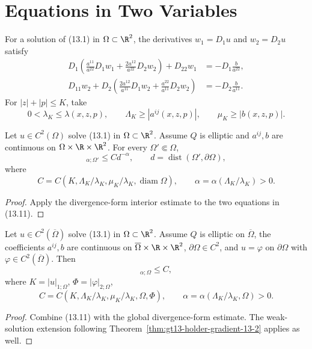 \section{Equations in Two Variables}

For a solution of \textup{(13.1)} in $\Omega\subset\R^2$, the derivatives
$w_1=D_1u$ and $w_2=D_2u$ satisfy
\begin{equation}
\begin{aligned}
D_1\!\left(\frac{a^{11}}{a^{22}}D_1w_1
 +\frac{2a^{12}}{a^{22}}D_2w_2\right)+D_{22}w_1
 &=-D_1\frac b{a^{22}},\\
D_{11}w_2+D_2\!\left(\frac{2a^{12}}{a^{11}}D_1w_2
 +\frac{a^{22}}{a^{11}}D_2w_2\right)
 &=-D_2\frac b{a^{11}}.
\end{aligned}
\tag{13.11}
\end{equation}
For $|z|+|p|\le K$, take
\begin{equation}
0<\lambda_K\le\lambda(x,z,p),\qquad
\Lambda_K\ge|a^{ij}(x,z,p)|,\qquad
\mu_K\ge|b(x,z,p)|.
\tag{13.12}
\end{equation}

\begin{theorem}
\label{thm:gt13-holder-gradient-13-3}
Let $u\in C^2(\Omega)$ solve \textup{(13.1)} in $\Omega\subset\R^2$.
Assume $Q$ is elliptic and $a^{ij},b$ are continuous on
$\Omega\times\R\times\R^2$.  For every $\Omega'\Subset\Omega$,
\begin{equation}
[Du]_{\alpha;\Omega'}\le Cd^{-\alpha},
\qquad d=\operatorname{dist}(\Omega',\partial\Omega),
\tag{13.13}
\end{equation}
where
\[
C=C(K,\Lambda_K/\lambda_K,\mu_K/\lambda_K,
\operatorname{diam}\Omega),
\qquad
\alpha=\alpha(\Lambda_K/\lambda_K)>0.
\]
\end{theorem}
\begin{proof}
\sketch Apply the divergence-form interior estimate to the two equations
in \textup{(13.11)}.
\end{proof}

\begin{theorem}
\label{thm:gt13-holder-gradient-13-4}
Let $u\in C^2(\overline\Omega)$ solve \textup{(13.1)} in
$\Omega\subset\R^2$.  Assume $Q$ is elliptic on $\overline\Omega$, the
coefficients $a^{ij},b$ are continuous on
$\overline\Omega\times\R\times\R^2$, $\partial\Omega\in C^2$, and
$u=\varphi$ on $\partial\Omega$ with
$\varphi\in C^2(\overline\Omega)$.  Then
\begin{equation}
[Du]_{\alpha;\Omega}\le C,
\tag{13.14}
\end{equation}
where $K=|u|_{1;\Omega}$, $\Phi=|\varphi|_{2;\Omega}$,
\[
C=C(K,\Lambda_K/\lambda_K,\mu_K/\lambda_K,\Omega,\Phi),
\qquad
\alpha=\alpha(\Lambda_K/\lambda_K,\Omega)>0.
\]
\end{theorem}
\begin{proof}
\sketch Combine \textup{(13.11)} with the global divergence-form estimate.
The weak-solution extension following Theorem~\ref{thm:gt13-holder-gradient-13-2}
applies as well.
\end{proof}

